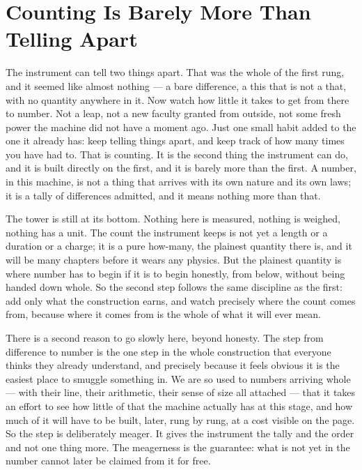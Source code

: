 \chapter{Counting Is Barely More Than Telling Apart}

The instrument can tell two things apart. That was the whole of the first rung, and it seemed like almost
nothing --- a bare difference, a this that is not a that, with no quantity anywhere in it. Now watch how little it
takes to get from there to number. Not a leap, not a new faculty granted from outside, not some fresh power the
machine did not have a moment ago. Just one small habit added to the one it already has: keep telling things
apart, and keep track of how many times you have had to. That is counting. It is the second thing the instrument
can do, and it is built directly on the first, and it is barely more than the first. A number, in this machine,
is not a thing that arrives with its own nature and its own laws; it is a tally of differences admitted, and it
means nothing more than that.

The tower is still at its bottom. Nothing here is measured, nothing is weighed, nothing has a
unit. The count the instrument keeps is not yet a length or a duration or a charge; it is a pure how-many, the
plainest quantity there is, and it will be many chapters before it wears any physics. But the plainest quantity
is where number has to begin if it is to begin honestly, from below, without being handed down whole. So the
second step follows the same discipline as the first: add only what the construction earns, and watch precisely
where the count comes from, because where it comes from is the whole of what it will ever mean.

There is a second reason to go slowly here, beyond honesty. The step from difference to number is the one step in
the whole construction that everyone thinks they already understand, and precisely because it feels obvious it is
the easiest place to smuggle something in. We are so used to numbers arriving whole --- with their line, their
arithmetic, their sense of size all attached --- that it takes an effort to see how little of that the machine
actually has at this stage, and how much of it will have to be built, later, rung by rung, at a cost visible on
the page. So the step is deliberately meager. It gives the instrument the tally and the order and not one thing
more. The meagerness is the guarantee: what is not yet in the number cannot later be claimed from it for free.

